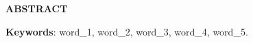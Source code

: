 
\begin{center}
  \textbf{ABSTRACT}  
\end{center}

\noindent
\lipsum[10][1-100]

\vspace{1\baselineskip}
\noindent
\textbf{Keywords}: word\_1, word\_2, word\_3, word\_4, word\_5.
\pagebreak
